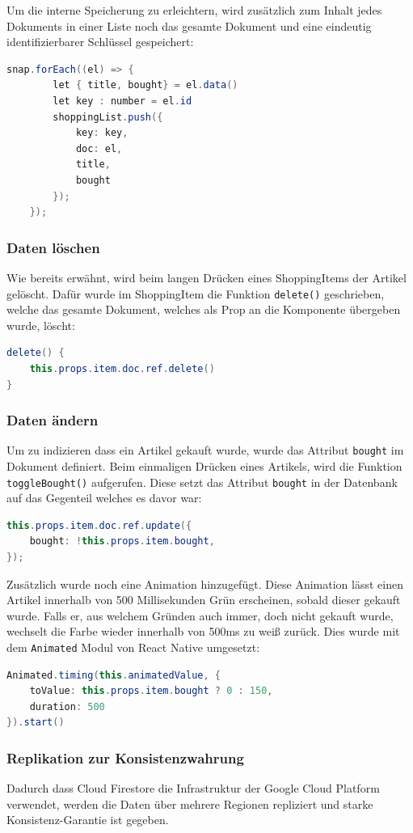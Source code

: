 Um die interne Speicherung zu erleichtern, wird zusätzlich zum Inhalt jedes Dokuments in einer Liste noch das gesamte Dokument und eine eindeutig identifizierbarer Schlüssel gespeichert:

\begin{lstlisting}[language=java]
	snap.forEach((el) => {
		let { title, bought} = el.data()
		let key : number = el.id
		shoppingList.push({
			key: key,
			doc: el,
			title,
			bought
		});
	});
\end{lstlisting}
\subsubsection{Daten löschen}
Wie bereits erwähnt, wird beim langen Drücken eines ShoppingItems der Artikel gelöscht. Dafür wurde im ShoppingItem die Funktion \verb|delete()| geschrieben, welche das gesamte Dokument, welches als Prop an die Komponente übergeben wurde, löscht:

\begin{lstlisting}[language=java]
delete() {
	this.props.item.doc.ref.delete()
}
\end{lstlisting}
\subsubsection{Daten ändern}
Um zu indizieren dass ein Artikel gekauft wurde, wurde das Attribut \verb|bought| im Dokument definiert. Beim einmaligen Drücken eines Artikels, wird die Funktion \verb|toggleBought()| aufgerufen. Diese setzt das Attribut \verb|bought| in der Datenbank auf das Gegenteil welches es davor war:

\begin{lstlisting}[language=java]
this.props.item.doc.ref.update({
	bought: !this.props.item.bought,
});
\end{lstlisting}

Zusätzlich wurde noch eine Animation hinzugefügt. Diese Animation lässt einen Artikel innerhalb von 500 Millisekunden Grün erscheinen, sobald dieser gekauft wurde. Falls er, aus welchem Gründen auch immer, doch nicht gekauft wurde, wechselt die Farbe wieder innerhalb von 500ms zu weiß zurück. Dies wurde mit dem \verb|Animated| Modul von React Native umgesetzt:

\begin{lstlisting}[language=java]
Animated.timing(this.animatedValue, {
	toValue: this.props.item.bought ? 0 : 150,
	duration: 500
}).start()
\end{lstlisting}
\subsubsection{Replikation zur Konsistenzwahrung}
Dadurch dass Cloud Firestore die Infrastruktur der Google Cloud Platform verwendet, werden die Daten über mehrere Regionen repliziert und starke Konsistenz-Garantie ist gegeben.\cite[Abs. Key capabilities]{CloudFir66:online}
